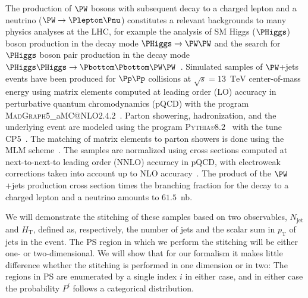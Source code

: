 \documentclass[twocolumn,epjc3]{svjour3}
\makeatletter
\newcommand{\PZggx}{\ensuremath{\PZ/\Pgamma^{*}}\xspace}
\newcommand{\pT}{\ensuremath{p_{\textrm{T}}}\xspace}
\newcommand{\HT}{\ensuremath{H_{\mathrm{T}}}\xspace}
\newcommand{\GeV}{\ensuremath{\textrm{GeV}}\xspace}
\newcommand{\TeV}{\ensuremath{\textrm{TeV}}\xspace}
\newcommand{\jet}{\ensuremath{\textrm{jet}}\xspace}
\newcommand{\MGvATNLO}{\textsc{MadGraph5}\_aMC@NLO\xspace}
\newcommand{\PYTHIA}{\textsc{Pythia}\xspace}
\makeatother
\begin{document}
The 
production of $\PW$ bosons with subsequent decay to a charged lepton and a neutrino ($\PW \to \Plepton\Pnu$)
constitutes a relevant backgrounds to many physics analyses at the LHC,
for example the analysis of SM Higgs ($\PHiggs$) boson production in the decay 
mode $\PHiggs \to \PW\PW$
and the search for $\PHiggs$ boson pair production in the decay 
mode $\PHiggs\PHiggs \to \Pbottom\Pbottom\PW\PW$~\cite{ATLAS:2014aga,Aad:2019yxi,CMS-HIG-13-027,CMS-HIG-17-006}.
Simulated samples of $\PW$+jets 
events have been produced for $\Pp\Pp$ collisions at $\sqrt{s}=13$~\TeV center-of-mass energy
using matrix elements computed at leading order (LO) 
accuracy in perturbative quantum chromodynamics (pQCD)
with the program \MGvATNLO $2.4.2$~\cite{Alwall:2014hca}.
Parton showering, hadronization, and the underlying event are modeled using the program \PYTHIA $v8.2$~\cite{Sjostrand:2014zea} with the tune \textrm{CP5}~\cite{Sirunyan:2019dfx}.
The matching of matrix elements to parton showers is done using the \textrm{MLM} scheme~\cite{Alwall:2007fs}.%
The 
samples are normalized using cross sections computed at next-to-next-to leading order (NNLO) accuracy in pQCD,
with electroweak corrections taken into account up to NLO accuracy~\cite{Li:2012wna}.
The product of the $\PW$+jets production cross section times the branching fraction for the decay to a charged lepton and a neutrino amounts to $61.5$~nb.

We will demonstrate the stitching of these samples based on two observables,
$N_{\jet}$ and $\HT$, defined as, respectively, the number of jets and the scalar sum in $\pT$ of jets in the event.
The PS region in which we perform the stitching will be either one- or two-dimensional.
We will show that for our formalism
it makes little difference whether the stitching is performed in one dimension or in two:
The regions in PS are enumerated by a single index $i$ in either case,
and in either case the probability $P^{i}$ follows a categorical distribution.
\end{document}
